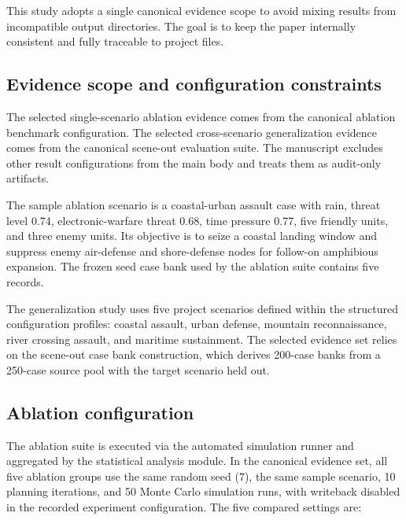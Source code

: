 This study adopts a single canonical evidence scope to avoid mixing results from incompatible output directories. The goal is to keep the paper internally consistent and fully traceable to project files.

\subsection{Evidence scope and configuration constraints}

The selected single-scenario ablation evidence comes from the canonical ablation benchmark configuration. The selected cross-scenario generalization evidence comes from the canonical scene-out evaluation suite. The manuscript excludes other result configurations from the main body and treats them as audit-only artifacts.

The sample ablation scenario is a coastal-urban assault case with rain, threat level 0.74, electronic-warfare threat 0.68, time pressure 0.77, five friendly units, and three enemy units. Its objective is to seize a coastal landing window and suppress enemy air-defense and shore-defense nodes for follow-on amphibious expansion. The frozen seed case bank used by the ablation suite contains five records.

The generalization study uses five project scenarios defined within the structured configuration profiles: coastal assault, urban defense, mountain reconnaissance, river crossing assault, and maritime sustainment. The selected evidence set relies on the scene-out case bank construction, which derives 200-case banks from a 250-case source pool with the target scenario held out.

\subsection{Ablation configuration}

The ablation suite is executed via the automated simulation runner and aggregated by the statistical analysis module. In the canonical evidence set, all five ablation groups use the same random seed (7), the same sample scenario, 10 planning iterations, and 50 Monte Carlo simulation runs, with writeback disabled in the recorded experiment configuration. The five compared settings are:

